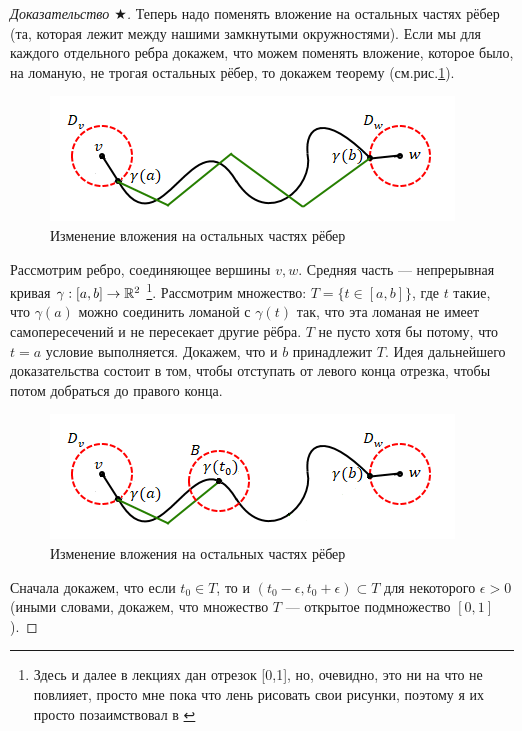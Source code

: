 \begin{proof}[Доказательство $\bigstar$]
    Теперь надо поменять вложение на остальных частях рёбер (та, которая лежит между нашими замкнутыми окружностями). Если мы для каждого отдельного ребра докажем, что можем поменять вложение, которое было, на ломаную, не трогая остальных рёбер, то докажем теорему (см.рис.\ref{fig:c3.7}).

    \begin{figure}[h]
        \centering
        \includegraphics[scale=0.7]{images/c3.7.png}
        \caption{Изменение вложения на остальных частях рёбер}
        \label{fig:c3.7}
    \end{figure}

    Рассмотрим ребро, соединяющее вершины $v, w$. Средняя часть — непрерывная кривая $\gamma: [a,b] \to \mathbb{R}^2$ \footnote{Здесь и далее в лекциях дан отрезок [0,1], но, очевидно, это ни на что не повлияет, просто мне пока что лень рисовать свои рисунки, поэтому я их просто позаимствовал в \cite{oshemkov}}. Рассмотрим множество: $T = \{t \in [a,b]\}$, где $t$ такие, что $\gamma(a)$ можно соединить ломаной с $\gamma(t)$ так, что эта ломаная не имеет самопересечений и не пересекает другие рёбра.
    $T$ не пусто хотя бы потому, что $t = a$ условие выполняется.
    Докажем, что и $b$ принадлежит $T$.
    Идея дальнейшего доказательства состоит в том, чтобы отступать от левого конца отрезка, чтобы потом добраться до правого конца.

    \begin{figure}[h]
        \centering
        \includegraphics[scale=0.7]{images/c3.8.png}
        \caption{Изменение вложения на остальных частях рёбер}
        \label{fig:c3.8}
    \end{figure}

    Сначала докажем, что если $t_0 \in T$, то и $(t_0 - \epsilon, t_0 + \epsilon) \subset T$ для некоторого $\epsilon > 0$ (иными словами, докажем, что множество $T$ — открытое подмножество $[0,1]$).


\end{proof}
